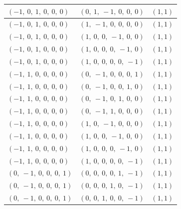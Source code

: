 \documentclass[11pt]{article}
\theoremstyle{definition}
\begin{document}
\begin{center}
\begin{tabular}{|l|l|c|}
    \hline
    $\left( -1, \  0, \  1, \  0, \  0, \  0\right)$ & $\left( 0, \  1, \  -1, \  0, \  0, \  0\right)$ & $(1,1)$ \\
    \hline
    $\left( -1, \  0, \  1, \  0, \  0, \  0\right)$ & $\left( 1, \  -1, \  0, \  0, \  0, \  0\right)$ & $(1,1)$ \\
    \hline
    $\left( -1, \  0, \  1, \  0, \  0, \  0\right)$ & $\left( 1, \  0, \  0, \  -1, \  0, \  0\right)$ & $(1,1)$ \\
    \hline
    $\left( -1, \  0, \  1, \  0, \  0, \  0\right)$ & $\left( 1, \  0, \  0, \  0, \  -1, \  0\right)$ & $(1,1)$ \\
    \hline
    $\left( -1, \  0, \  1, \  0, \  0, \  0\right)$ & $\left( 1, \  0, \  0, \  0, \  0, \  -1\right)$ & $(1,1)$ \\
    \hline
    $\left( -1, \  1, \  0, \  0, \  0, \  0\right)$ & $\left( 0, \  -1, \  0, \  0, \  0, \  1\right)$ & $(1,1)$ \\
    \hline
    $\left( -1, \  1, \  0, \  0, \  0, \  0\right)$ & $\left( 0, \  -1, \  0, \  0, \  1, \  0\right)$ & $(1,1)$ \\
    \hline
    $\left( -1, \  1, \  0, \  0, \  0, \  0\right)$ & $\left( 0, \  -1, \  0, \  1, \  0, \  0\right)$ & $(1,1)$ \\
    \hline
    $\left( -1, \  1, \  0, \  0, \  0, \  0\right)$ & $\left( 0, \  -1, \  1, \  0, \  0, \  0\right)$ & $(1,1)$ \\
    \hline
    $\left( -1, \  1, \  0, \  0, \  0, \  0\right)$ & $\left( 1, \  0, \  -1, \  0, \  0, \  0\right)$ & $(1,1)$ \\
    \hline
    $\left( -1, \  1, \  0, \  0, \  0, \  0\right)$ & $\left( 1, \  0, \  0, \  -1, \  0, \  0\right)$ & $(1,1)$ \\
    \hline
    $\left( -1, \  1, \  0, \  0, \  0, \  0\right)$ & $\left( 1, \  0, \  0, \  0, \  -1, \  0\right)$ & $(1,1)$ \\
    \hline
    $\left( -1, \  1, \  0, \  0, \  0, \  0\right)$ & $\left( 1, \  0, \  0, \  0, \  0, \  -1\right)$ & $(1,1)$ \\
    \hline
    $\left( 0, \  -1, \  0, \  0, \  0, \  1\right)$ & $\left( 0, \  0, \  0, \  0, \  1, \  -1\right)$ & $(1,1)$ \\
    \hline
    $\left( 0, \  -1, \  0, \  0, \  0, \  1\right)$ & $\left( 0, \  0, \  0, \  1, \  0, \  -1\right)$ & $(1,1)$ \\
    \hline
    $\left( 0, \  -1, \  0, \  0, \  0, \  1\right)$ & $\left( 0, \  0, \  1, \  0, \  0, \  -1\right)$ & $(1,1)$ \\

\end{tabular}
\end{center}
\end{document}

